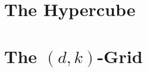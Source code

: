 \documentclass[a4paper,UKenglish]{lipics-v2016}
\begin{document}
\section{The Hypercube}

\section{The $(d,k)$-Grid}



\end{document}
